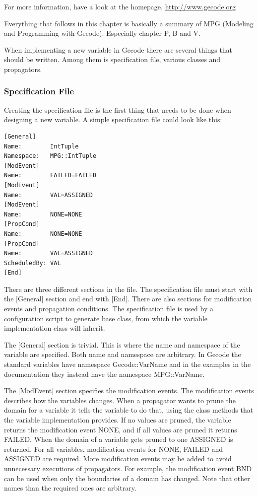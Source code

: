 \documentclass[a4paper,11pt]{article}
\begin{document}
For more information, have a look at the homepage. \url{http://www.gecode.org}

Everything that follows in this chapter is basically a summary of MPG (Modeling and Programming with Gecode). Especially chapter P, B and V.

When implementing a new variable in Gecode there are several things that should be written. Among them is specification file, various classes and propagators.
\subsubsection{Specification File}\label{sec:specfile}
Creating the specification file is the first thing that needs to be done when designing a new variable.  A simple specification file could look like this:

\begin{lstlisting}[frame=single]
[General]
Name:        IntTuple
Namespace:   MPG::IntTuple
[ModEvent]
Name:        FAILED=FAILED
[ModEvent]
Name:        VAL=ASSIGNED
[ModEvent]
Name:        NONE=NONE
[PropCond]
Name:        NONE=NONE
[PropCond]
Name:        VAL=ASSIGNED
ScheduledBy: VAL
[End]
\end{lstlisting}
There are three different sections in the file. The specification file must start with the [General] section and end with [End]. There are also sections for modification events and propagation conditions. The specification file is used by a configuration script to generate base class, from which the variable implementation class will inherit.

The [General] section is trivial. This is where the name and namespace of the variable are specified. Both name and namespace are arbitrary. In Gecode the standard variables have namespace Gecode::VarName and in the examples in the documentation they instead have the namespace MPG::VarName.

The [ModEvent] section specifies the modification events. The modification events describes how the variables changes. When a propagator wants to prune the domain for a variable it tells the variable to do that, using the class methods that the variable implementation provides. If no values are pruned, the variable returns the modification event NONE, and if all values are pruned it returns FAILED. When the domain of a variable gets pruned to one ASSIGNED is returned. For all variables, modification events for NONE, FAILED and ASSIGNED are required. More modification events may be added to avoid unnecessary executions of propagators. For example, the modification event BND can be used when only the boundaries of a domain has changed. Note that other names than the required ones are arbitrary.
\end{document}
